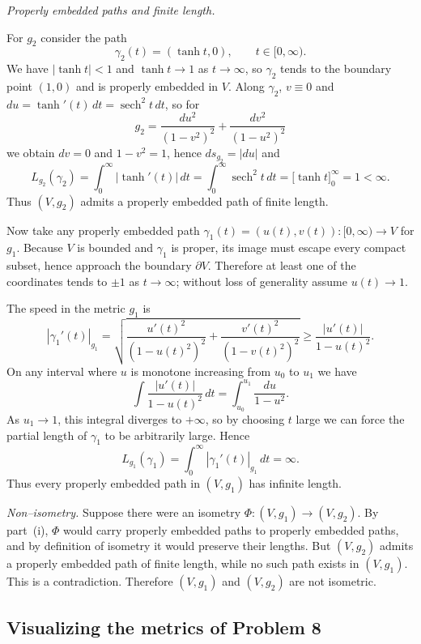 \documentclass[12pt,a4paper]{article}
\theoremstyle{plain}
\theoremstyle{definition}      %
\begin{document}
	\medskip\noindent
	\emph{Properly embedded paths and finite length.}
	
	For $g_2$ consider the path
	\[
	\gamma_2(t) = (\tanh t,0),\qquad t\in[0,\infty).
	\]
	We have $|\tanh t|<1$ and $\tanh t\to 1$ as $t\to\infty$, so $\gamma_2$ tends to
	the boundary point $(1,0)$ and is properly embedded in $V$.
	Along $\gamma_2$, $v\equiv 0$ and $du=\tanh'(t)\,dt=\operatorname{sech}^2 t\,dt$,
	so for
	\[
	g_2 = \frac{du^2}{(1-v^2)^2} + \frac{dv^2}{(1-u^2)^2}
	\]
	we obtain $dv=0$ and $1-v^2=1$, hence $ds_{g_2}=|du|$ and
	\[
	L_{g_2}(\gamma_2)
	= \int_0^\infty |\tanh'(t)|\,dt
	= \int_0^\infty \operatorname{sech}^2 t\,dt
	= \bigl[\tanh t\bigr]_0^\infty = 1 <\infty.
	\]
	Thus $(V,g_2)$ admits a properly embedded path of finite length.
	
	Now take any properly embedded path
	$\gamma_1(t)=(u(t),v(t)):[0,\infty)\to V$ for $g_1$.
	Because $V$ is bounded and $\gamma_1$ is proper, its image must
	escape every compact subset, hence approach the boundary $\partial V$.
	Therefore at least one of the coordinates tends to $\pm 1$
	as $t\to\infty$; without loss of generality assume $u(t)\to 1$.
	
	The speed in the metric $g_1$ is
	\[
	|\gamma_1'(t)|_{g_1}
	= \sqrt{\frac{u'(t)^2}{(1-u(t)^2)^2}
		+\frac{v'(t)^2}{(1-v(t)^2)^2}}
	\ge \frac{|u'(t)|}{1-u(t)^2}.
	\]
	On any interval where $u$ is monotone increasing from $u_0$ to $u_1$ we have
	\[
	\int \frac{|u'(t)|}{1-u(t)^2}\,dt
	= \int_{u_0}^{u_1} \frac{du}{1-u^2}.
	\]
	As $u_1\to 1$, this integral diverges to $+\infty$, so by choosing $t$ large
	we can force the partial length of $\gamma_1$ to be arbitrarily large.
	Hence
	\[
	L_{g_1}(\gamma_1)=\int_0^\infty |\gamma_1'(t)|_{g_1}\,dt = \infty.
	\]
	Thus every properly embedded path in $(V,g_1)$ has infinite length.
	
	\medskip\noindent
	\emph{Non–isometry.}
	Suppose there were an isometry $\Phi:(V,g_1)\to(V,g_2)$.
	By part~(i), $\Phi$ would carry properly embedded paths to properly embedded
	paths, and by definition of isometry it would preserve their lengths.
	But $(V,g_2)$ admits a properly embedded path of finite length,
	while no such path exists in $(V,g_1)$.
	This is a contradiction. Therefore $(V,g_1)$ and $(V,g_2)$ are not isometric.
	
	\qedhere
	
	
	\subsection*{Visualizing the metrics of Problem 8}
	
\end{document}
